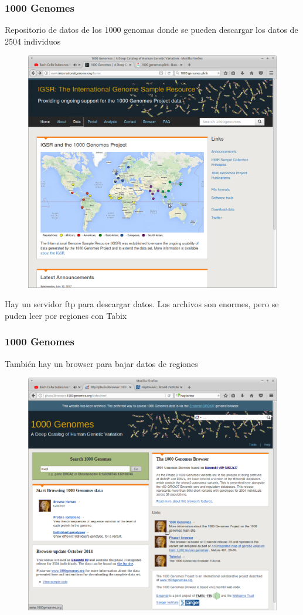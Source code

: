 \documentclass{beamer}\usepackage[]{graphicx}\usepackage[]{color}
\begin{document}
\begin{frame}[fragile]
\frametitle{1000 Genomes}
Repositorio de datos de los 1000 genomas donde se pueden descargar los datos de 2504 individuos

\begin{figure}[htbp]
\begin{center}
\includegraphics[width=.6\linewidth]{home1k.png}
\end{center}
\end{figure}
Hay un servidor ftp para descargar datos. 
Los archivos son enormes, pero se puden leer por regiones con Tabix
\end{frame}



\begin{frame}[fragile]
\frametitle{1000 Genomes}
Tambi\'en hay un browser para bajar datos de regiones \begin{figure}[htbp]
\begin{center}
\includegraphics[width=.7\linewidth]{mapt.png}
\end{center}
\end{figure}

\end{frame}
\end{document}
